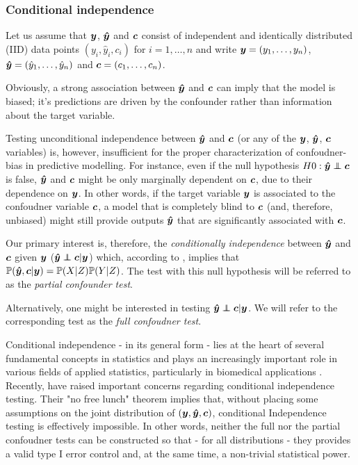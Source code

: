 \documentclass{article}
\begin{document}
\subsubsection*{Conditional independence}

Let us assume that $\boldsymbol{y}$, $\boldsymbol{\hat{y}}$ and $\boldsymbol{c}$ consist of independent and identically distributed (IID) data points $(y_i, \hat{y}_i, c_i)$ for $i=1, \dots , n$ and write $\boldsymbol{y}=(y_1, \dots ,y_n)$, $\boldsymbol{\hat{y}}=(\hat{y}_1, \dots, \hat{y}_n)$ and $\boldsymbol{c}=(c_1, \dots, c_n)$. 

Obviously, a strong association between $\boldsymbol{\hat{y}}$ and $\boldsymbol{c}$ can imply that the model is biased; it's predictions are driven by the confounder rather than information about the target variable.

Testing unconditional independence between $\boldsymbol{\hat{y}}$ and $\boldsymbol{c}$ (or any of the $\boldsymbol{y}$, $\boldsymbol{\hat{y}}$, $\boldsymbol{c}$ variables) is, however, insufficient for the proper characterization of confoudner-bias in predictive modelling.
For instance, even if the null hypothesis $H0 : \yhat \independent \c$ is false, $\boldsymbol{\hat{y}}$ and $\boldsymbol{c}$ might be only marginally dependent on $\boldsymbol{c}$, due to their dependence on $\boldsymbol{y}$. In other words, if the target variable $\boldsymbol{y}$ is associated to the confoudner variable $\boldsymbol{c}$, a model that is completely blind to $\boldsymbol{c}$ (and, therefore, unbiased) might still provide outputs $\boldsymbol{\hat{y}}$ that are significantly associated with $\boldsymbol{c}$.

Our primary interest is, therefore, the \emph{conditionally independence} between $\boldsymbol{\hat{y}}$ and $\boldsymbol{c}$ given $\boldsymbol{y}$ ($\yhat \independent \c | \y$) which, according to \cite{dawid1979conditional}, implies that $\mathbb{P}(\boldsymbol{\hat{y}}, \boldsymbol{c}|\boldsymbol{y}) = \mathbb{P}(X|Z)\mathbb{P}(Y|Z)$. The test with this null hypothesis will be referred to as the \emph{partial confounder test}.

Alternatively, one might be interested in testing $\yhat \independent \c | \y$. We will refer to the corresponding test as the \emph{full confoudner test}.

 Conditional independence - in its general form - lies at the heart of several fundamental concepts in statistics and  plays an increasingly important role in various fields of applied statistics, particularly in biomedical applications \citep{spirtes2000causation, peters2016causal, fiedler2011mediation, candes2016panning}. Recently, \cite{shah2020hardness} have raised important concerns regarding conditional independence testing.
 Their "no free lunch" theorem implies that, without placing some assumptions on the joint distribution of $(\boldsymbol{y}, \boldsymbol{\hat{y}}, \boldsymbol{c})$, conditional Independence testing is effectively impossible. In other words, neither the full nor the partial confoudner tests can be constructed so that - for all distributions - they provides a valid type I error control and, at the same time, a non-trivial statistical power.
\end{document}
